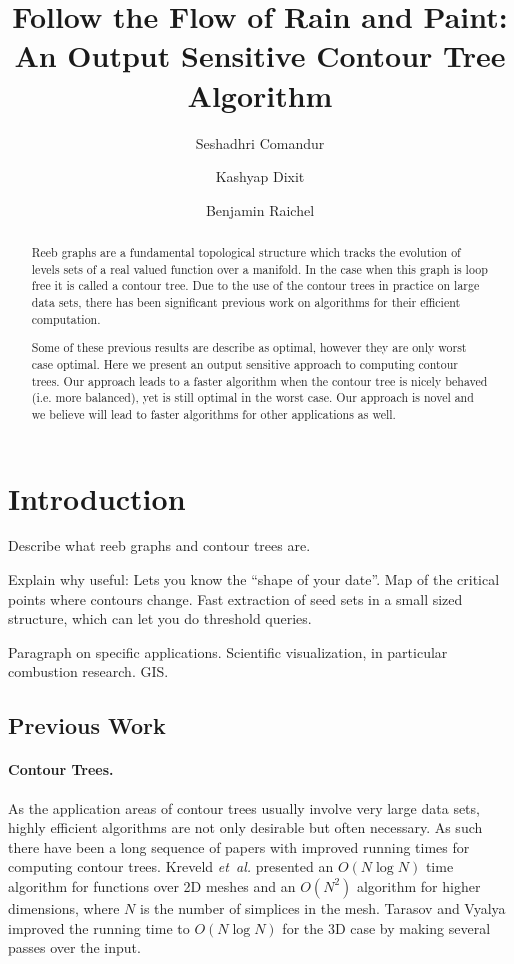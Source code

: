 \documentclass[11pt]{article}
\author{
  Seshadhri Comandur
  \and
  Kashyap Dixit
  \and
  Benjamin Raichel
}
\title{Follow the Flow of Rain and Paint: \break An Output Sensitive Contour Tree Algorithm}
\theoremstyle{definition}
\newcommand{\etal}{\textit{et~al.}\xspace}
\begin{document}
\maketitle

\begin{abstract}
Reeb graphs are a fundamental topological structure which tracks the evolution of levels sets of a real valued function over a manifold.  In the case when this graph is loop free it is called a contour tree.  Due to the use of the contour trees in practice on large data sets, there has been significant previous work on algorithms for their efficient computation. 

Some of these previous results are describe as optimal, however they are only worst case optimal.  Here we present an output sensitive approach to computing contour trees.  Our approach leads to a faster algorithm when the contour tree is nicely behaved (i.e. more balanced), yet is still optimal in the worst case.  Our approach is novel and we believe will lead to faster algorithms for other applications as well.
\end{abstract}


\section{Introduction}
Describe what reeb graphs and contour trees are.

\medskip
\noindent
Explain why useful:  Lets you know the ``shape of your date''.  Map of the critical points where contours change.  Fast extraction of seed sets in a small sized structure, which can let you do threshold queries.

\medskip
\noindent
Paragraph on specific applications.  Scientific visualization, in particular combustion research.  GIS.

\subsection{Previous Work}

\paragraph{Contour Trees.}
As the application areas of contour trees usually involve very large data sets, highly efficient algorithms are not only desirable but often necessary.  As such there have been a long sequence of papers with improved running times for computing contour trees.  Kreveld \etal \cite{kobps-ctsssit-97} presented an $O(N\log N)$ time algorithm for functions over 2D meshes and an $O(N^2)$ algorithm for higher dimensions, where $N$ is the number of simplices in the mesh. Tarasov and Vyalya \cite{tv-cct-98} improved the running time to $O(N\log N)$ for the 3D case by making several passes over the input.
\end{document}
